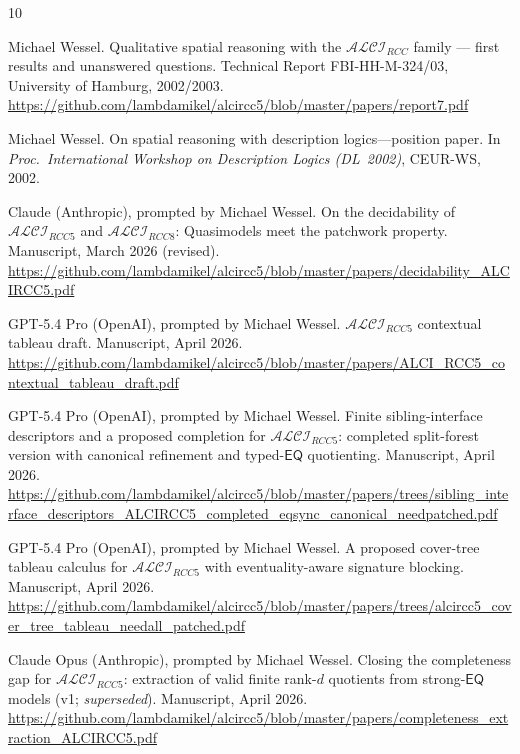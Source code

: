 \documentclass[a4paper,11pt]{article}
\theoremstyle{definition}
\newcommand{\EQ}{\ensuremath{\mathsf{EQ}}}
\begin{document}
\begin{thebibliography}{10}

Michael Wessel.
\newblock Qualitative spatial reasoning with the $\mathcal{ALCI}_{RCC}$
  family --- first results and unanswered questions.
\newblock Technical Report FBI-HH-M-324/03, University of Hamburg, 2002/2003.
\newblock \url{https://github.com/lambdamikel/alcircc5/blob/master/papers/report7.pdf}

Michael Wessel.
\newblock On spatial reasoning with description logics---position paper.
\newblock In \emph{Proc.\ International Workshop on Description Logics
  (DL~2002)}, CEUR-WS, 2002.

Claude (Anthropic), prompted by Michael Wessel.
\newblock On the decidability of $\mathcal{ALCI}_{RCC5}$ and
  $\mathcal{ALCI}_{RCC8}$: Quasimodels meet the patchwork property.
\newblock Manuscript, March 2026 (revised).
\newblock \url{https://github.com/lambdamikel/alcircc5/blob/master/papers/decidability_ALCIRCC5.pdf}

GPT-5.4 Pro (OpenAI), prompted by Michael Wessel.
\newblock $\mathcal{ALCI}_{RCC5}$ contextual tableau draft.
\newblock Manuscript, April 2026.
\newblock \url{https://github.com/lambdamikel/alcircc5/blob/master/papers/ALCI_RCC5_contextual_tableau_draft.pdf}

GPT-5.4 Pro (OpenAI), prompted by Michael Wessel.
\newblock Finite sibling-interface descriptors and a proposed completion
  for $\mathcal{ALCI}_{RCC5}$: completed split-forest version with
  canonical refinement and typed-$\EQ$ quotienting.
\newblock Manuscript, April 2026.
\newblock \url{https://github.com/lambdamikel/alcircc5/blob/master/papers/trees/sibling_interface_descriptors_ALCIRCC5_completed_eqsync_canonical_needpatched.pdf}

GPT-5.4 Pro (OpenAI), prompted by Michael Wessel.
\newblock A proposed cover-tree tableau calculus for
  $\mathcal{ALCI}_{RCC5}$ with eventuality-aware signature blocking.
\newblock Manuscript, April 2026.
\newblock \url{https://github.com/lambdamikel/alcircc5/blob/master/papers/trees/alcircc5_cover_tree_tableau_needall_patched.pdf}

Claude Opus (Anthropic), prompted by Michael Wessel.
\newblock Closing the completeness gap for $\mathcal{ALCI}_{RCC5}$:
  extraction of valid finite rank-$d$ quotients from strong-$\EQ$
  models (v1; \emph{superseded}).
\newblock Manuscript, April 2026.
\newblock \url{https://github.com/lambdamikel/alcircc5/blob/master/papers/completeness_extraction_ALCIRCC5.pdf}


\end{thebibliography}
\end{document}
